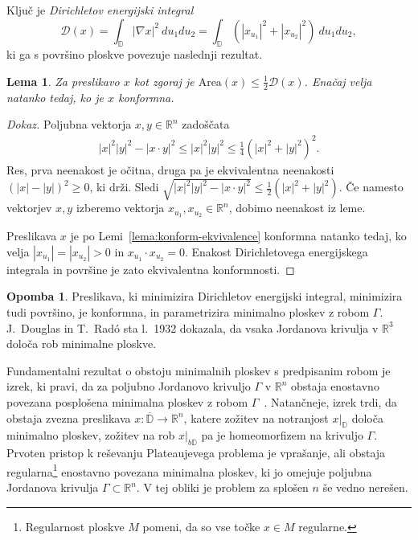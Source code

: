 \documentclass[12pt,a4paper,twoside]{article}
\theoremstyle{definition} %
\newtheorem{opomba}[definicija]{Opomba}
\newenvironment{dokaz}[1][Dokaz]{\begin{proof}[#1]}{\end{proof}}
\theoremstyle{plain} %
\newtheorem{lema}[definicija]{Lema}
\numberwithin{equation}{section}  %
\newcommand{\R}{\mathbb R}
\begin{document}
Ključ je \emph{Dirichletov energijski integral} 
\begin{equation} \label{eq:Dirichlet-int}
\mathcal{D}(x) = \int_{\mathbb{D}} |\nabla x|^2 \ du_{1}du_{2} = \int_{\mathbb{D}} (|x_{u_1}|^2 + |x_{u_2}|^2) \ du_{1}du_{2},
\end{equation}
ki ga s površino ploskve povezuje naslednji rezultat.

\begin{lema} \label{lema:Area<=D/2}
Za preslikavo $x$ kot zgoraj je $\mathrm{Area}(x) \leq \frac{1}{2} \mathcal{D}(x)$. Enačaj velja natanko tedaj, ko je $x$ konformna.
\end{lema}

\begin{dokaz}
Poljubna vektorja $x,y \in \mathbb{R}^{n}$ zadoščata
\begin{gather*}
|x|^2 |y|^2 - |x \cdot y|^2 \leq |x|^2 |y|^2 \leq \frac{1}{4} (|x|^2 + |y|^2)^2.
\end{gather*}
Res, prva neenakost je očitna, druga pa je ekvivalentna neenakosti $(|x|-|y|)^2 \geq 0$, ki drži.
Sledi $\sqrt{|x|^2 |y|^2 - |x \cdot y|^2} \leq \frac{1}{2} (|x|^2 + |y|^2)$. Če namesto vektorjev $x,y$ izberemo vektorja $x_{u_1}, x_{u_2} \in \mathbb{R}^{n}$, dobimo neenakost iz leme.

Preslikava $x$ je po Lemi~\ref{lema:konform-ekvivalence} konformna natanko tedaj, ko velja $|x_{u_1}| = |x_{u_2}| > 0$ in $x_{u_1} \cdot x_{u_2} = 0$. Enakost Dirichletovega energijskega integrala in površine je zato ekvivalentna konformnosti.
\end{dokaz}

\begin{opomba} %
Preslikava, ki minimizira Dirichletov energijski integral, minimizira tudi površino, je konformna, in parametrizira minimalno ploskev z robom $\Gamma$.
J.~Douglas in T.~Rad\'o sta l.~1932 dokazala, da vsaka Jordanova krivulja v $\mathbb{R}^3$ določa rob minimalne ploskve.

Fundamentalni rezultat o obstoju minimalnih ploskev s predpisanim robom je izrek, ki pravi, da za poljubno Jordanovo krivuljo $\Gamma$ v $\R^{n}$ obstaja enostavno povezana posplošena minimalna ploskev z robom $\Gamma$~\cite[Theorem~7.1]{osserman2002survey}. 
Natančneje, izrek trdi, da obstaja zvezna preslikava $x \colon \overline{\mathbb{D}} \to \R^{n}$, katere zožitev na notranjost $x|_{\mathbb{D}}$ določa minimalno ploskev, zožitev na rob $x|_{b\mathbb{D}}$ pa je homeomorfizem na krivuljo $\Gamma$.
\newline
Prvoten pristop k reševanju Plateaujevega problema je vprašanje, ali obstaja regularna\footnote{Regularnost ploskve $M$ pomeni, da so vse točke $x \in M$ regularne.} enostavno povezana minimalna ploskev, ki jo omejuje poljubna Jordanova krivulja $\Gamma \subset \R^{n}$. V tej obliki je problem za splošen $n$ še vedno nerešen.
\end{opomba}
\end{document}
